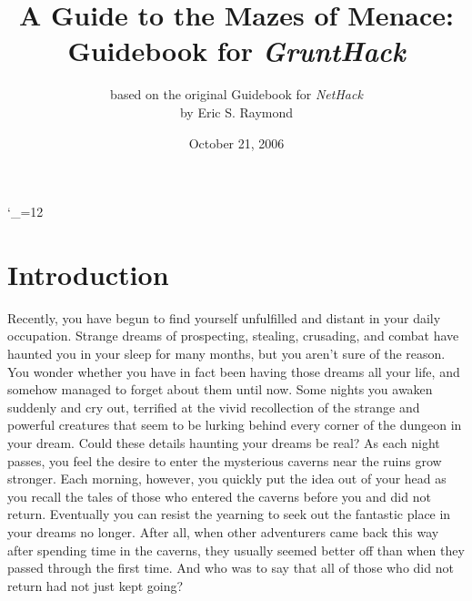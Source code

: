 
\textheight 220mm
\textwidth 160mm
\oddsidemargin 0mm
\evensidemargin 0mm
\topmargin 0mm

\newcommand{\nd}{\noindent}

\newcommand{\tb}[1]{\tt #1 \hfill}
\newcommand{\bb}[1]{\bf #1 \hfill}
\newcommand{\ib}[1]{\it #1 \hfill}

\newcommand{\blist}[1]
{\begin{list}{$\bullet$}
    {\leftmargin 30mm \topsep 2mm \partopsep 0mm \parsep 0mm \itemsep 1mm
         \labelwidth 28mm \labelsep 2mm
	      #1}}
	      
\newcommand{\elist}{\end{list}}
	      
\catcode`\_=12

%
%
\title{\LARGE A Guide to the Mazes of Menace:\\
\Large Guidebook for {\it GruntHack\/}}

\author{based on the original Guidebook for {\it NetHack\/}\\
by Eric S. Raymond }
\date{October 21, 2006}

\maketitle
\section{Introduction}

Recently, you have begun to find yourself unfulfilled and distant 
in your daily occupation.  Strange dreams of prospecting, stealing, 
crusading, and combat have haunted you in your sleep for many months, 
but you aren't sure of the reason.  You wonder whether you have in 
fact been having those dreams all your life, and somehow managed to 
forget about them until now.  Some nights you awaken suddenly
and cry out, terrified at the vivid recollection of the strange and 
powerful creatures that seem to be lurking behind every corner of the 
dungeon in your dream.  Could these details haunting your dreams be real?  
As each night passes, you feel the desire to enter the mysterious caverns 
near the ruins grow stronger.  Each morning, however, you quickly put 
the idea out of your head as you recall the tales of those who entered 
the caverns before you and did not return.  Eventually you can resist 
the yearning to seek out the fantastic place in your dreams no longer.  
After all, when other adventurers came back this way after spending time 
in the caverns, they usually seemed better off than when they passed 
through the first time.  And who was to say that all of those who did 
not return had not just kept going?


